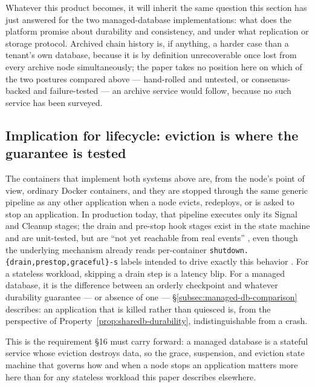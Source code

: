 Whatever this product becomes, it will inherit the same question this section has just
answered for the two managed-database implementations: what does the platform promise
about durability and consistency, and under what replication or storage protocol.
Archived chain history is, if anything, a harder case than a tenant's own database,
because it is by definition unrecoverable once lost from every archive node
simultaneously; the paper takes no position here on which of the two postures compared
above --- hand-rolled and untested, or consensus-backed and failure-tested --- an
archive service would follow, because no such service has been surveyed.

\subsection{Implication for lifecycle: eviction is where the guarantee is tested}
\label{subsec:managed-db-lifecycle}

The containers that implement both systems above are, from the node's point of view,
ordinary Docker containers, and they are stopped through the same generic pipeline as
any other application when a node evicts, redeploys, or is asked to stop an
application. In production today, that pipeline executes only its Signal and Cleanup
stages; the drain and pre-stop hook stages exist in the state machine and are
unit-tested, but are ``not yet reachable from real events''
, even
though the underlying mechanism already reads per-container
\texttt{shutdown.\{drain,prestop,graceful\}-s} labels intended to drive exactly this
behavior . For a
stateless workload, skipping a drain step is a latency blip. For a managed database, it
is the difference between an orderly checkpoint and whatever durability guarantee ---
or absence of one --- \S\ref{subsec:managed-db-comparison} describes: an application
that is killed rather than quiesced is, from the perspective of
Property~\ref{prop:sharedb-durability}, indistinguishable from a crash.

This is the requirement §16 must carry forward: a managed database is a stateful
service whose eviction destroys data, so the grace, suspension, and eviction state
machine that governs how and when a node stops an application matters more here than
for any stateless workload this paper describes elsewhere.

\FloatBarrier
